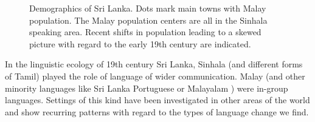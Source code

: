 \documentclass[a4paper,10pt]{article}
\begin{document}
\begin{figure}
 \caption{Demographics of Sri Lanka. Dots mark main towns with Malay population. The Malay population centers are all in the Sinhala speaking area. Recent shifts in population leading to a skewed picture with regard to the early 19th century are indicated.}
\label{fig:maps}
\end{figure}


In the linguistic ecology of 19th century Sri Lanka, Sinhala (and different forms of Tamil) played the role of language of wider communication. Malay (and other minority languages like Sri Lanka Portuguese \citep{Smith1979} or Malayalam \citep{Senaratne2005}) were in-group languages. Settings of this kind have been investigated in other areas of the world and show recurring patterns with regard to the types of language change we find.
\end{document}
